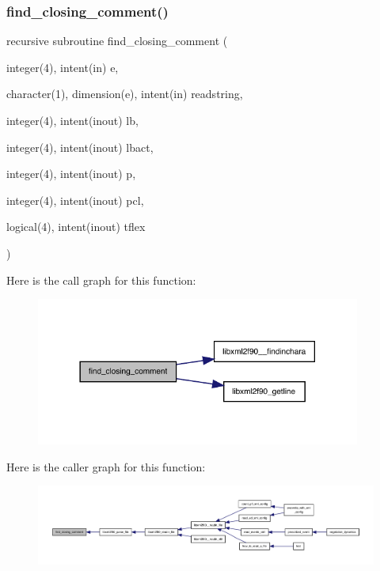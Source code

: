\subsubsection{\texorpdfstring{find\+\_\+closing\+\_\+comment()}{find\_closing\_comment()}}
{\footnotesize\ttfamily recursive subroutine find\+\_\+closing\+\_\+comment (\begin{DoxyParamCaption}\item[{integer(4), intent(in)}]{e,  }\item[{character(1), dimension(e), intent(in)}]{readstring,  }\item[{integer(4), intent(inout)}]{lb,  }\item[{integer(4), intent(inout)}]{lbact,  }\item[{integer(4), intent(inout)}]{p,  }\item[{integer(4), intent(inout)}]{pcl,  }\item[{logical(4), intent(inout)}]{tflex }\end{DoxyParamCaption})}

Here is the call graph for this function\+:
\nopagebreak
\begin{figure}[H]
\begin{center}
\leavevmode
\includegraphics[width=302pt]{libxml2f90_8f90__pp_8f90_a2db841b17a0ef4d76e4b31f4ff479f4c_cgraph}
\end{center}
\end{figure}
Here is the caller graph for this function\+:
\nopagebreak
\begin{figure}[H]
\begin{center}
\leavevmode
\includegraphics[width=350pt]{libxml2f90_8f90__pp_8f90_a2db841b17a0ef4d76e4b31f4ff479f4c_icgraph}
\end{center}
\end{figure}
\mbox{\label{libxml2f90_8f90__pp_8f90_a5522c3c4e981b0b62e1ddd6f3d77ba44}} 
